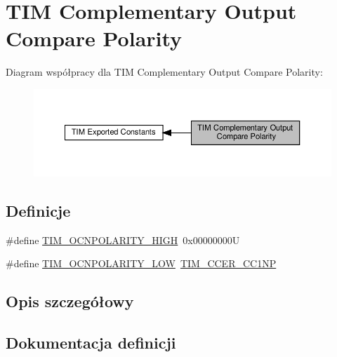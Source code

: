 \hypertarget{group___t_i_m___output___compare___n___polarity}{}\section{T\+IM Complementary Output Compare Polarity}
\label{group___t_i_m___output___compare___n___polarity}
Diagram współpracy dla T\+IM Complementary Output Compare Polarity\+:\nopagebreak
\begin{figure}[H]
\begin{center}
\leavevmode
\includegraphics[width=350pt]{group___t_i_m___output___compare___n___polarity}
\end{center}
\end{figure}
\subsection*{Definicje}
\begin{DoxyCompactItemize}
\item 
\#define \hyperlink{group___t_i_m___output___compare___n___polarity_gad5dbeb61519e4fd55db3a4d136e96316}{T\+I\+M\+\_\+\+O\+C\+N\+P\+O\+L\+A\+R\+I\+T\+Y\+\_\+\+H\+I\+GH}~0x00000000U
\item 
\#define \hyperlink{group___t_i_m___output___compare___n___polarity_gadb44419c891a58e2cde11cc016f71a14}{T\+I\+M\+\_\+\+O\+C\+N\+P\+O\+L\+A\+R\+I\+T\+Y\+\_\+\+L\+OW}~\hyperlink{group___peripheral___registers___bits___definition_ga403fc501d4d8de6cabee6b07acb81a36}{T\+I\+M\+\_\+\+C\+C\+E\+R\+\_\+\+C\+C1\+NP}
\end{DoxyCompactItemize}


\subsection{Opis szczegółowy}


\subsection{Dokumentacja definicji}
\mbox{\label{group___t_i_m___output___compare___n___polarity_gad5dbeb61519e4fd55db3a4d136e96316}} 
